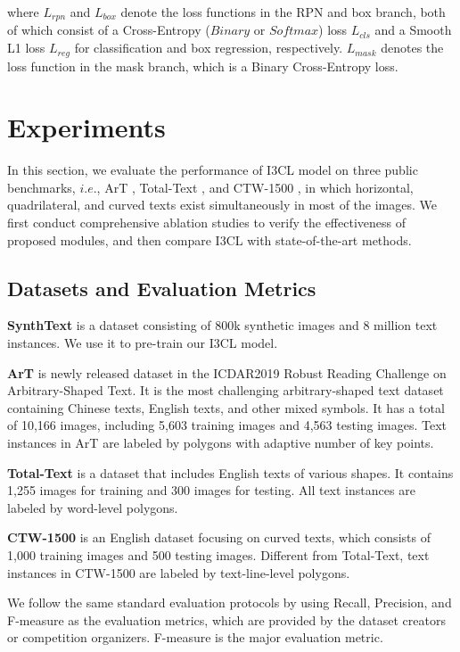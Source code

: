 where $L_{rpn}$ and $L_{box}$ denote the loss functions in the RPN and box branch, both of which consist of a Cross-Entropy ($Binary$ or $Softmax$) loss $L_{cls}$ and a Smooth L1 loss $L_{reg}$ for classification and box regression, respectively. $L_{mask}$ denotes the loss function in the mask branch, which is a Binary Cross-Entropy loss.


\section{Experiments}
In this section, we evaluate the performance of I3CL model on three public benchmarks, $i.e.$, ArT \citep{icdar2019art}, Total-Text \citep{totaltext}, and CTW-1500 \citep{ctw1500}, in which horizontal, quadrilateral, and curved texts exist simultaneously in most of the images. We first conduct comprehensive ablation studies to verify the effectiveness of proposed modules, and then compare I3CL with state-of-the-art methods.

\subsection{Datasets and Evaluation Metrics}
\textbf{SynthText} \citep{synthtext} is a dataset consisting of 800k synthetic images and 8 million text instances. We use it to pre-train our I3CL model.

\textbf{ArT} \citep{icdar2019art} is newly released dataset in the ICDAR2019 Robust Reading Challenge on Arbitrary-Shaped Text. It is the most challenging arbitrary-shaped text dataset containing Chinese texts, English texts, and other mixed symbols. It has a total of 10,166 images, including 5,603 training images and 4,563 testing images. Text instances in ArT are labeled by polygons with adaptive number of key points.

\textbf{Total-Text} \citep{totaltext} is a dataset that includes English texts of various shapes. It contains 1,255 images for training and 300 images for testing. All text instances are labeled by word-level polygons. 

\textbf{CTW-1500} \citep{ctw1500} is an English dataset focusing on curved texts, which consists of 1,000 training images and 500 testing images. Different from Total-Text, text instances in CTW-1500 are labeled by text-line-level polygons.

We follow the same standard evaluation protocols by using Recall, Precision, and F-measure as the evaluation metrics, which are provided by the dataset creators or competition organizers. F-measure is the major evaluation metric.


